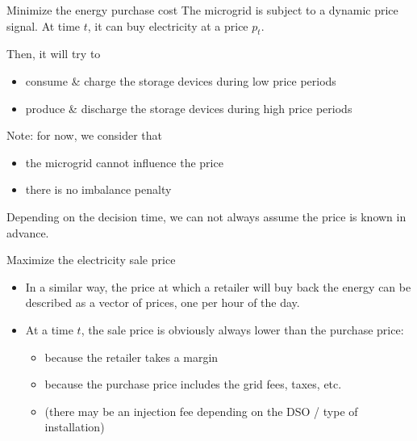 \begin{frame}{Minimize the energy purchase cost}
The microgrid is subject to a dynamic price signal. At time $t$, it can buy electricity at a price $p_{t}$.

Then, it will try to
\begin{itemize}
  \item consume \& charge the storage devices during low price periods
  \item produce \& discharge the storage devices during high price periods
\end{itemize}
Note: for now, we consider that
\begin{itemize}
  \item the microgrid cannot influence the price
  \item there is no imbalance penalty
\end{itemize}

Depending on the decision time, we can not always assume the price is known in advance.

\end{frame} 

\begin{frame}{Maximize the electricity sale price}
\begin{itemize}
  \item In a similar way, the price at which a retailer will buy back the energy can be described as a vector of prices, one per hour of the day.
  \item At a time $t$, the sale price is obviously always lower than the purchase price:
  \begin{itemize}
    \item because the retailer takes a margin
    \item because the purchase price includes the grid fees, taxes, etc.
    \item (there may be an injection fee depending on the DSO / type of installation)
  \end{itemize}
\end{itemize}

\end{frame} 

